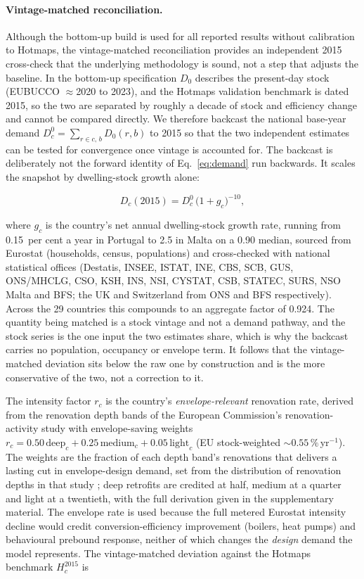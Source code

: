 \paragraph{Vintage-matched reconciliation.}
Although the bottom-up build is used for all reported results without calibration
to Hotmaps, the vintage-matched reconciliation provides an independent 2015
cross-check that the underlying methodology is sound, not a step that adjusts the
baseline. In the bottom-up specification $D_0$ describes the present-day stock
(EUBUCCO $\approx$2020 to 2023), and the Hotmaps validation benchmark is dated 2015, so the two are separated by roughly a decade of stock and efficiency change
and cannot be compared directly. We therefore backcast the national base-year
demand $D_c^{0}=\sum_{r\in c,\,b} D_0(r,b)$ to 2015 so that the two independent
estimates can be tested for convergence once vintage is accounted for. The backcast is
deliberately not the forward identity of Eq.~\eqref{eq:demand} run backwards. It scales
the snapshot by dwelling-stock growth alone:

\begin{equation}
    D_c(2015) = D_c^{0}\,\bigl(1+g_c\bigr)^{-10},
    \label{eq:backcast}
\end{equation}

\noindent where $g_c$ is the country's net annual dwelling-stock growth rate, running
from 0.15~per cent a year in Portugal to 2.5 in Malta on a 0.90 median, sourced from
Eurostat (households, census, populations) and cross-checked with national statistical
offices (Destatis, INSEE, ISTAT, INE, CBS, SCB, GUS, ONS/MHCLG, CSO, KSH, INS, NSI,
CYSTAT, CSB, STATEC, SURS, NSO Malta and BFS; the UK and Switzerland from ONS and BFS
respectively). Across the 29 countries this compounds to an aggregate factor of 0.924.
The quantity being matched is a stock vintage and not a demand pathway, and the stock
series is the one input the two estimates share, which is why the backcast carries no
population, occupancy or envelope term. It follows that the vintage-matched deviation
sits below the raw one by construction and is the more conservative of the two, not a
correction to it.

The intensity factor $r_c$ is the country's \emph{envelope-relevant} renovation rate,
derived from the renovation depth bands of the European Commission's renovation-activity study \citep{Esser2019renovation} with envelope-saving weights $r_c =
0.50\,\mathrm{deep}_c + 0.25\,\mathrm{medium}_c + 0.05\,\mathrm{light}_c$ (EU
stock-weighted $\sim 0.55\,\%$\,yr$^{-1}$). The weights are the fraction of each depth
band's renovations that delivers a lasting cut in envelope-design demand, set from the distribution of renovation depths in that study \citep{Esser2019renovation}; deep
retrofits are credited at half, medium at a quarter and light at a twentieth, with the
full derivation given in the supplementary material. The envelope rate is used because the full
metered Eurostat intensity decline would credit conversion-efficiency improvement
(boilers, heat pumps) and behavioural prebound response, neither of which changes the
\emph{design} demand the model represents. The vintage-matched deviation
against the Hotmaps benchmark $H_c^{2015}$ is

